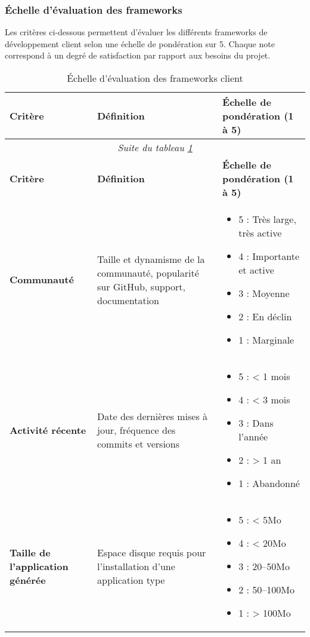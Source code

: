 \subsubsection{Échelle d’évaluation des frameworks} \label{sec:criteria_frameworks}

Les critères ci-dessous permettent d’évaluer les différents frameworks de développement client selon une échelle de pondération sur 5.
Chaque note correspond à un degré de satisfaction par rapport aux besoins du projet.

\begin{longtable}{|p{}|p{}|p{}|}
\caption{\label{tab:echelle_frameworks} Échelle d’évaluation des frameworks client} \\
\hline
\textbf{Critère} & \textbf{Définition} & \textbf{Échelle de pondération (1 à 5)} \\
\hline
\endfirsthead

\multicolumn{3}{c}{\textit{Suite du tableau \ref{tab:echelle_frameworks}}} \\
\hline
\textbf{Critère} & \textbf{Définition} & \textbf{Échelle de pondération (1 à 5)} \\
\hline
\endhead

\textbf{Communauté} & Taille et dynamisme de la communauté, popularité sur GitHub, support, documentation & 
\begin{itemize}
    \item 5 : Très large, très active
    \item 4 : Importante et active
    \item 3 : Moyenne
    \item 2 : En déclin
    \item 1 : Marginale
\end{itemize} \\
\hline

\textbf{Activité récente} & Date des dernières mises à jour, fréquence des commits et versions & 
\begin{itemize}
    \item 5 : < 1 mois
    \item 4 : < 3 mois
    \item 3 : Dans l’année
    \item 2 : > 1 an
    \item 1 : Abandonné
\end{itemize} \\
\hline

\textbf{Taille de l’application générée} & Espace disque requis pour l’installation d’une application type & 
\begin{itemize}
    \item 5 : < 5Mo
    \item 4 : < 20Mo
    \item 3 : 20–50Mo
    \item 2 : 50–100Mo
    \item 1 : > 100Mo
\end{itemize} \\
\hline


\end{longtable}
